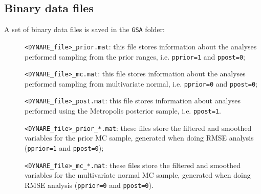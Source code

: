 \documentclass[12pt,a4paper]{article}
\begin{document}
\subsection{Binary data files}
A set of binary data files is saved in the \verb"GSA" folder:
\begin{description}
\item[]\verb"<DYNARE_file>_prior.mat": this file stores
information about the analyses performed sampling from the prior
ranges, i.e. \verb"pprior=1" and \verb"ppost=0";
\item[]\verb"<DYNARE_file>_mc.mat": this file stores
information about the analyses performed sampling from
multivariate normal, i.e. \verb"pprior=0" and \verb"ppost=0";
\item[]\verb"<DYNARE_file>_post.mat": this file stores information
about analyses performed using the Metropolis posterior sample,
i.e. \verb"ppost=1".
\end{description}

\begin{description}
\item[]\verb"<DYNARE_file>_prior_*.mat": these files store
the filtered and smoothed variables for the prior MC sample,
generated when doing  RMSE analysis (\verb"pprior=1" and
\verb"ppost=0");
\item[]\verb"<DYNARE_file>_mc_*.mat": these files store
the filtered and smoothed variables for the multivariate normal MC
sample, generated when doing  RMSE analysis (\verb"pprior=0" and
\verb"ppost=0").
\end{description}
\end{document}
